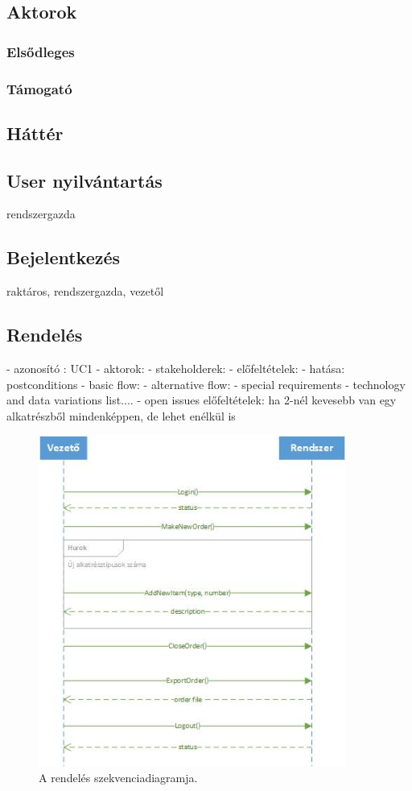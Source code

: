 \documentclass[11pt]{article}\usepackage[left=20mm,right=20mm,top=15mm,bottom=20mm]{geometry}
\begin{document}
\subsection{Aktorok}
\subsubsection{Elsődleges}
\subsubsection{Támogató}
\subsection{Háttér}

\subsection{User nyilvántartás}
rendszergazda

\subsection{Bejelentkezés}
raktáros, rendszergazda, vezetől

\subsection{Rendelés}
- azonosító : UC1
- aktorok: 
- stakeholderek:
- előfeltételek:
- hatása: postconditions
- basic flow:
- alternative flow:
- special requirements
- technology and data variations list.... 
- open issues
előfeltételek: ha 2-nél kevesebb van egy alkatrészből mindenképpen, de lehet enélkül is

\begin{figure}[!h]
    \centering
        \includegraphics[width=0.9\textwidth]{figures/rendeles_SD.jpg}
        \caption{A rendelés szekvenciadiagramja.}
\end{figure}
\end{document}
